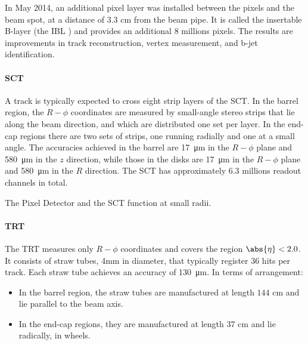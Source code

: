 In May 2014, an additional pixel layer was installed between the pixels and the
beam spot, at a distance of $3.3$ cm from the beam pipe. It is called the
insertable B-layer (the IBL \cite{atlasblayer}) and provides an additional $8$
millions pixels. The results are improvements in track reconstruction, vertex
measurement, and b-jet identification.

\paragraph{SCT} A track is typically expected to cross eight strip layers of
the SCT. In the barrel region, the $R-\phi$ coordinates are measured by
small-angle stereo strips that lie along the beam direction, and which are
distributed one set per layer. In the end-cap regions there are two sets of
strips, one running radially and one at a small angle. The accuracies achieved
in the barrel are \SI{17}{\micro\meter} in the $R-\phi$ plane and
\SI{580}{\micro\meter} in the $z$ direction, while those in the disks are
\SI{17}{\micro\meter} in the $R-\phi$ plane and \SI{580}{\micro\meter} in the
$R$ direction. The SCT has approximately $6.3$ millions readout channels in
total.

\vspace{2mm}

The Pixel Detector and the SCT function at small radii.

\vspace{5mm}

\paragraph{TRT} The TRT measures only $R-\phi$ coordinates and covers the
region $\abs{\eta} < 2.0$. It consists of straw tubes, 4mm in diameter, that
typically register $36$ hits per track. Each straw tube achieves an accuracy of
\SI{130}{\micro\meter}. In terms of arrangement:

\begin{itemize}

	\item In the barrel region, the straw tubes are manufactured at length $144$ cm
	      and lie parallel to the beam axis.

	\item In the end-cap regions, they are manufactured at length $37$ cm and lie
	      radically, in wheels.

\end{itemize}

